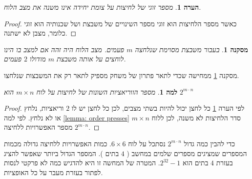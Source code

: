 \documentclass[12pt,leqno]{article}
\theoremstyle{theoremdd}
\newtheorem{corollary}{מסקנה}[section]
\newtheorem{lemma}{למה}[section]
\newtheorem{comm}{הערה}[section]
\begin{document}
\begin{comm}
    מספר זוגי של לחיצות על צומת יחידה אינו משנה את מצב הלוח.
\end{comm}
\begin{proof}
    כאשר מספר הלחיצות הוא זוגי מספר השינויים של משבצת
    ושל שכנותיה הוא זוגי כלומר, מצבן לא ישתנה.
\end{proof}
\begin{corollary}
    \label{corollary:gamplay-desc-single-press-key}
    בעבור משבצת מסוימת שנלחצה 
    $m$
    פעמים.
    מצב הלוח
    היה זהה אם 
    למצב בו הינו לוחצים 
    על אותה משבצת
    $m$
    מודולו
    $2$
    פעמים.
\end{corollary}
מסקנה
\ref{corollary:gamplay-desc-single-press-key}
ממחישה 
שכדי לתאר פתרון של משחק מספיק לתאר רק את המשבצות שנלחצו.
\begin{lemma}
    \label{lemma: num presses}
    מספר הווריאציות השונות של לחיצות על לוח
    $m \times n$
    הוא 
    $2^{m \cdot n}$
\end{lemma}
\begin{proof}
לפי הערה 
\ref{corollary:gamplay-desc-single-press-key}
כל לחצן יכול להיות בשתי מצבים,
לכן כל לחצן יש לו 
$2$
וריאציות,
נלחץ או לא נלחץ.
לפי
למה
\ref{lemma: order presses}
סדר הלחיצות לא משנה,
לכן ללוח
$m \times n$
מספר האפשרויות ללחיצה 
$2^{m \cdot n}$.
\end{proof}
כדי להבין כמה גדול
$2^{m \cdot n}$
נסתכל על לוח 
$6 \times 6$.
כמות האפשרויות ללחיצה גדולה 
מכמות המספרים שמציגים מספרים שלמים במחשב
(
$4$
בתים
).
המספר הגדול ביותר שאפשר להציג בעזרת 
$4$
בתים
הוא
$2^{32}-1$.
המטרה של המחשה זו היא להדגיש כמה לא פרקטי לנסות לפתור בעזרת
מעבר על כל האופציות.
\end{document}
